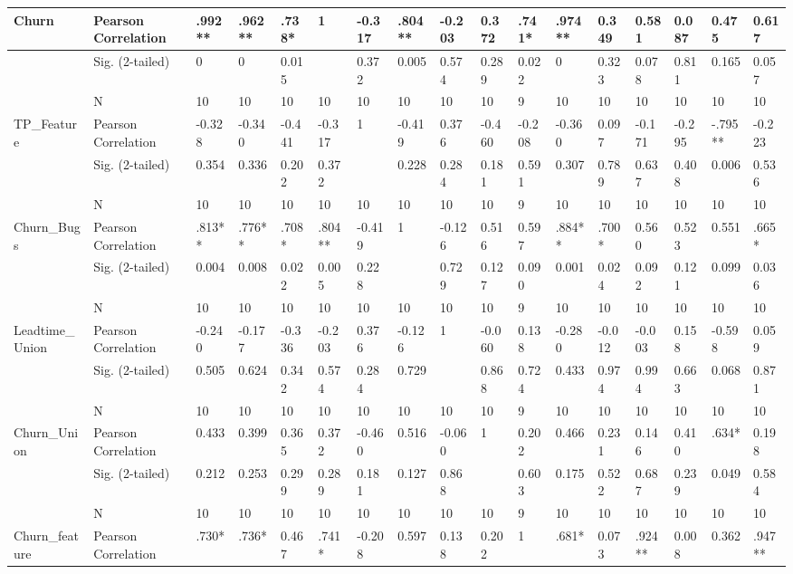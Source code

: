 \documentclass[UKenglish]{ifimaster}  %
\begin{document}
\begin{table}[htbp]
\begin{adjustwidth}{-2cm}{}
{\begin{tabular}{ | l | l | l | l | l | l | l | l | l | l | l | l | l | l | l | l | l | }
	Churn & Pearson Correlation & .992** & .962** & .738* & 1 & -0.317 & .804** & -0.203 & 0.372 & .741* & .974** & 0.349 & 0.581 & 0.087 & 0.475 & 0.617\\ \hline
	 & Sig. (2-tailed) & 0 & 0 & 0.015 &  & 0.372 & 0.005 & 0.574 & 0.289 & 0.022 & 0 & 0.323 & 0.078 & 0.811 & 0.165 & 0.057\\ \hline
	 & N & 10 & 10 & 10 & 10 & 10 & 10 & 10 & 10 & 9 & 10 & 10 & 10 & 10 & 10 & 10 \\ \hline
	TP\_Feature & Pearson Correlation & -0.328 & -0.340 & -0.441 & -0.317 & 1 & -0.419 & 0.376 & -0.460 & -0.208 & -0.360 & 0.097 & -0.171 & -0.295 & -.795** & -0.223\\ \hline
	 & Sig. (2-tailed) & 0.354 & 0.336 & 0.202 & 0.372 &  & 0.228 & 0.284 & 0.181 & 0.591 & 0.307 & 0.789 & 0.637 & 0.408 & 0.006 & 0.536\\ \hline
	 & N & 10 & 10 & 10 & 10 & 10 & 10 & 10 & 10 & 9 & 10 & 10 & 10 & 10 & 10 & 10 \\ \hline
	Churn\_Bugs & Pearson Correlation & .813** & .776** & .708* & .804** & -0.419 & 1 & -0.126 & 0.516 & 0.597 & .884** & .700* & 0.560 & 0.523 & 0.551 & .665* \\ \hline
	 & Sig. (2-tailed) & 0.004 & 0.008 & 0.022 & 0.005 & 0.228 &  & 0.729 & 0.127 & 0.090 & 0.001 & 0.024 & 0.092 & 0.121 & 0.099 & 0.036\\ \hline
	 & N & 10 & 10 & 10 & 10 & 10 & 10 & 10 & 10 & 9 & 10 & 10 & 10 & 10 & 10 & 10 \\ \hline
	Leadtime\_Union & Pearson Correlation & -0.240 & -0.177 & -0.336 & -0.203 & 0.376 & -0.126 & 1 & -0.060 & 0.138 & -0.280 & -0.012 & -0.003 & 0.158 & -0.598 & 0.059\\ \hline
	 & Sig. (2-tailed) & 0.505 & 0.624 & 0.342 & 0.574 & 0.284 & 0.729 &  & 0.868 & 0.724 & 0.433 & 0.974 & 0.994 & 0.663 & 0.068 & 0.871\\ \hline
	 & N & 10 & 10 & 10 & 10 & 10 & 10 & 10 & 10 & 9 & 10 & 10 & 10 & 10 & 10 & 10 \\ \hline
	Churn\_Union & Pearson Correlation & 0.433 & 0.399 & 0.365 & 0.372 & -0.460 & 0.516 & -0.060 & 1 & 0.202 & 0.466 & 0.231 & 0.146 & 0.410 & .634* & 0.198\\ \hline
	 & Sig. (2-tailed) & 0.212 & 0.253 & 0.299 & 0.289 & 0.181 & 0.127 & 0.868 &  & 0.603 & 0.175 & 0.522 & 0.687 & 0.239 & 0.049 & 0.584\\ \hline
	 & N & 10 & 10 & 10 & 10 & 10 & 10 & 10 & 10 & 9 & 10 & 10 & 10 & 10 & 10 & 10 \\ \hline
	Churn\_feature & Pearson Correlation & .730* & .736* & 0.467 & .741* & -0.208 & 0.597 & 0.138 & 0.202 & 1 & .681* & 0.073 & .924** & 0.008 & 0.362 & .947** \\ \hline

\end{tabular}}
\end{adjustwidth}
\end{table}
\end{document}

